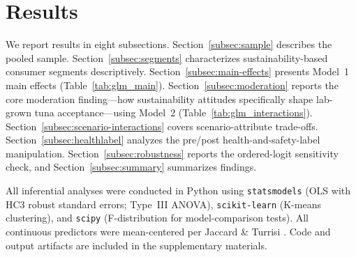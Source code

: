 %
%
%
%

\section{Results}\label{sec:results}

We report results in eight subsections. Section~\ref{subsec:sample} describes the pooled sample. Section~\ref{subsec:segments} characterizes sustainability-based consumer segments descriptively. Section~\ref{subsec:main-effects} presents Model~1 main effects (Table~\ref{tab:glm_main}). Section~\ref{subsec:moderation} reports the core moderation finding---how sustainability attitudes specifically shape lab-grown tuna acceptance---using Model~2 (Table~\ref{tab:glm_interactions}). Section~\ref{subsec:scenario-interactions} covers scenario-attribute trade-offs. Section~\ref{subsec:healthlabel} analyzes the pre/post health-and-safety-label manipulation. Section~\ref{subsec:robustness} reports the ordered-logit sensitivity check, and Section~\ref{subsec:summary} summarizes findings.

All inferential analyses were conducted in Python using \texttt{statsmodels} (OLS with HC3 robust standard errors; Type~III ANOVA), \texttt{scikit-learn} (K-means clustering), and \texttt{scipy} (F-distribution for model-comparison tests). All continuous predictors were mean-centered per Jaccard \& Turrisi \citep{jaccard2003}. Code and output artifacts are included in the supplementary materials.

